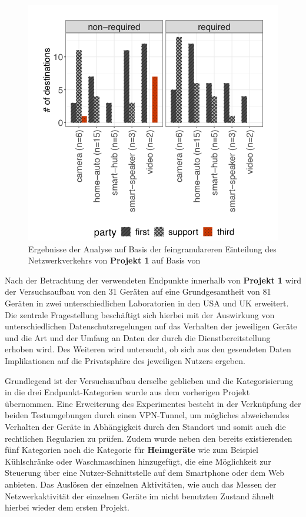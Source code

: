 \begin{figure}
    \centering
    \includegraphics[scale=0.3]{main/pictures/projekt_one/Non_Required_Destination_Per_Party}
    \caption{Ergebnisse der Analyse auf Basis der feingranulareren Einteilung des Netzwerkverkehrs von \textbf{Projekt 1} auf Basis von \cite{Mandalari2021}}
    \label{fig:result-non-req-dest-per-party}
\end{figure}

\noindent Nach der Betrachtung der verwendeten Endpunkte innerhalb von \textbf{Projekt 1} wird der Versuchsaufbau von den 31 Geräten auf eine Grundgesamtheit von 81 Geräten in zwei unterschiedlichen Laboratorien in den USA und UK erweitert. 
Die zentrale Fragestellung beschäftigt sich hierbei mit der Auswirkung von unterschiedlichen Datenschutzregelungen auf das Verhalten der jeweiligen Geräte und die Art und der Umfang an Daten der durch die Dienstbereitstellung erhoben wird. Des Weiteren wird untersucht, ob sich aus den gesendeten Daten Implikationen auf die Privatsphäre des jeweiligen Nutzers ergeben.

\noindent Grundlegend ist der Versuchsaufbau derselbe geblieben und die Kategorisierung in die drei Endpunkt-Kategorien wurde aus dem vorherigen Projekt übernommen. Eine Erweiterung des Experimentes besteht in der Verknüpfung der beiden Testumgebungen durch einen VPN-Tunnel, um mögliches abweichendes Verhalten der Geräte in Abhängigkeit durch den Standort und somit auch die rechtlichen Regularien zu prüfen. 
Zudem wurde neben den bereits existierenden fünf Kategorien noch die Kategorie für \textbf{Heimgeräte} wie zum Beispiel Kühlschränke oder Waschmaschinen hinzugefügt, die eine Möglichkeit zur Steuerung über eine Nutzer-Schnittstelle auf dem Smartphone oder dem Web anbieten. 
Das Auslösen der einzelnen Aktivitäten, wie auch das Messen der Netzwerkaktivität der einzelnen Geräte im nicht benutzten Zustand ähnelt hierbei wieder dem ersten Projekt.

